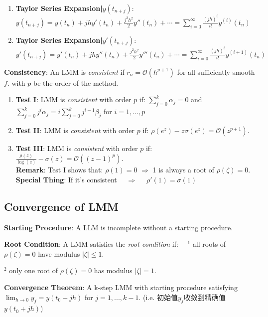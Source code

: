 \documentclass[9pt]{article}
\begin{document}
\begin{enumerate}[itemsep=-2pt, topsep=-2pt]
    \item \textbf{Taylor Series Expansion|$y(t_{n+j})$}: $y(t_{n+j})=y(t_n)+jhy'(t_n)+\frac{j^2h^2}{2}y''(t_n)+\cdots=\sum_{i=0}^{\infty}\frac{(jh)^i}{i!}y^{(i)}(t_n)$
    \item \textbf{Taylor Series Expansion|$y'(t_{n+j})$}: $y'(t_{n+j})=y'(t_n)+jhy''(t_n)+\frac{j^2h^2}{2}y'''(t_n)+\cdots=\sum_{i=0}^{\infty}\frac{(jh)^i}{i!}y^{(i+1)}(t_n)$
\end{enumerate}

\textbf{Consistency}: An LMM is \textit{consistent} if $r_n=\mathcal{O}(h^{p+1})$ for all sufficiently smooth $f$. \quad with $p$ be the order of the method.

\begin{enumerate}[itemsep=-2pt, topsep=-2pt]
    \item \textbf{Test I}: LMM is \textit{consistent} with order $p$ if: $\sum_{j=0}^{k}\alpha_j=0$ and $\sum_{j=0}^{k}j^i\alpha_j=i\sum_{j=0}^{k}j^{i-1}\beta_j$ for $i=1,...,p$
    \item \textbf{Test II}: LMM is \textit{consistent} with order $p$ if: $\rho(e^{z})-z\sigma(e^{z})=\mathcal{O}(z^{p+1})$.
    \item \textbf{Test III}: LMM is \textit{consistent} with order $p$ if: $\frac{\rho(z)}{\log(z)}-\sigma(z)=\mathcal{O}((z-1)^p)$. \\
    \textbf{Remark}: Test I shows that: $\rho(1)=0$ $\Rightarrow$ 1 is always a root of $\rho(\zeta)=0$. \\
    \textbf{Special Thing}: If it's consistent \ \ $\Rightarrow$ \ \ $\rho'(1)=\sigma(1)$
\end{enumerate}


\subsection{Convergence of LMM} %

\textbf{Starting Procedure}: A LLM is incomplete without a starting procedure. 

\textbf{Root Condition}: A LMM satisfies the \textit{root condition} if: \ \ $^1$ all roots of $\rho(\zeta)=0$ have modulus $|\zeta|\leq1$. 

\hspace{235pt} $^2$ only one root of $\rho(\zeta)=0$ has modulus $|\zeta|=1$.

\textbf{Convergence Theorem}: {\small A k-step LMM with starting procedure satisfying $\lim_{h\to0}y_j=y(t_0+jh)$ for $j=1,...,k-1$. {\tiny (i.e. 初始值$y_j$收敛到精确值$y(t_0+jh)$)}}
\end{document}
